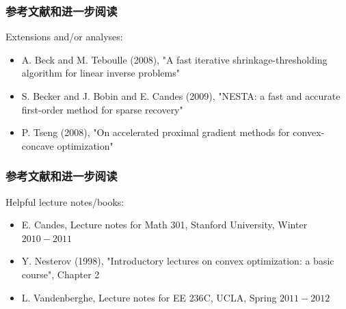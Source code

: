 \documentclass[handout]{beamer}
\begin{document}
\begin{frame}

\frametitle{参考文献和进一步阅读}

Extensions and/or analyses:

\begin{itemize}%
\item A. Beck and M. Teboulle (2008), "A fast iterative shrinkage-thresholding algorithm for linear inverse problems"

\item S. Becker and J. Bobin and E. Candes (2009), "NESTA: a fast and accurate first-order method for sparse recovery"

\item P. Tseng (2008), "On accelerated proximal gradient methods for convex-concave optimization"
\end{itemize}




\end{frame}
\begin{frame}

\frametitle{参考文献和进一步阅读}

Helpful lecture notes/books:
\begin{itemize}%
\item E. Candes, Lecture notes for Math 301, Stanford University, Winter $2010-2011$

\item Y. Nesterov (1998), "Introductory lectures on convex optimization: a basic course", Chapter 2

\item L. Vandenberghe, Lecture notes for EE $236 \mathrm{C}$, UCLA, Spring $2011-2012$
\end{itemize}

\end{frame}



























\end{document}
